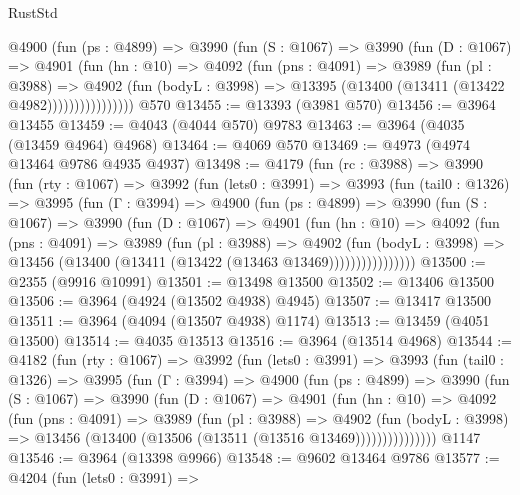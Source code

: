 \begin{lexlean}{RustStd}
\begin{coremodule}
              @4900
                (fun (ps : @4899) =>
                @3990
                  (fun (S : @1067) =>
                  @3990
                    (fun (D : @1067) =>
                    @4901
                      (fun (hn : @10) =>
                      @4092
                        (fun (pns : @4091) =>
                        @3989
                          (fun (pl : @3988) =>
                          @4902
                            (fun (bodyL : @3998) =>
                            @13395 (@13400 (@13411 (@13422 @4982))))))))))))))))
    @570
@13455 := @13393 (@3981 @570)
@13456 := @3964 @13455
@13459 := @4043 (@4044 @570) @9783
@13463 := @3964 (@4035 (@13459 @4964) @4968)
@13464 := @4069 @570
@13469 := @4973 (@4974 @13464 @9786 @4935 @4937)
@13498 := @4179
    (fun (rc : @3988) =>
    @3990
      (fun (rty : @1067) =>
      @3992
        (fun (lets0 : @3991) =>
        @3993
          (fun (tail0 : @1326) =>
          @3995
            (fun (Γ : @3994) =>
            @4900
              (fun (ps : @4899) =>
              @3990
                (fun (S : @1067) =>
                @3990
                  (fun (D : @1067) =>
                  @4901
                    (fun (hn : @10) =>
                    @4092
                      (fun (pns : @4091) =>
                      @3989
                        (fun (pl : @3988) =>
                        @4902
                          (fun (bodyL : @3998) =>
                          @13456 (@13400 (@13411 (@13422 (@13463 @13469))))))))))))))))
@13500 := @2355 (@9916 @10991)
@13501 := @13498 @13500
@13502 := @13406 @13500
@13506 := @3964 (@4924 (@13502 @4938) @4945)
@13507 := @13417 @13500
@13511 := @3964 (@4094 (@13507 @4938) @1174)
@13513 := @13459 (@4051 @13500)
@13514 := @4035 @13513
@13516 := @3964 (@13514 @4968)
@13544 := @4182
    (fun (rty : @1067) =>
    @3992
      (fun (lets0 : @3991) =>
      @3993
        (fun (tail0 : @1326) =>
        @3995
          (fun (Γ : @3994) =>
          @4900
            (fun (ps : @4899) =>
            @3990
              (fun (S : @1067) =>
              @3990
                (fun (D : @1067) =>
                @4901
                  (fun (hn : @10) =>
                  @4092
                    (fun (pns : @4091) =>
                    @3989
                      (fun (pl : @3988) =>
                      @4902
                        (fun (bodyL : @3998) =>
                        @13456 (@13400 (@13506 (@13511 (@13516 @13469)))))))))))))))
    @1147
@13546 := @3964 (@13398 @9966)
@13548 := @9602 @13464 @9786
@13577 := @4204
    (fun (lets0 : @3991) =>

\end{coremodule}
\end{lexlean}
